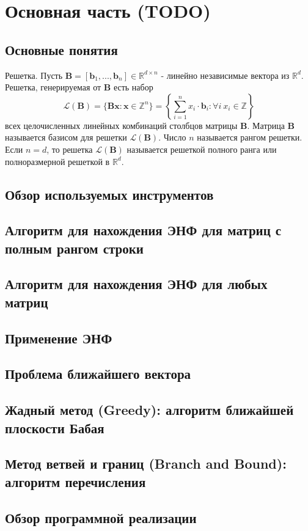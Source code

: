\newpage

\section{Основная часть (TODO)}

\subsection{Основные понятия}
Решетка. Пусть $ \mathbf{B} = [\mathbf{b}_1, ..., \mathbf{b}_n] \in \mathbb{R}^{d \times n} $ - линейно независимые вектора из $ \mathbb{R}^d $. Решетка, генерируемая от $\mathbf{B}$ есть набор $$ \mathcal{L}(\mathbf{B}) = \lbrace \mathbf{Bx}: \mathbf{x} \in \mathbb{Z}^n \rbrace = \left\{ \sum\limits_{i=1}^n x_i \cdot \mathbf{b}_i: \forall i \ x_i \in \mathbb{Z} \right\} $$
всех целочисленных линейных комбинаций столбцов матрицы $\mathbf{B}$. Матрица $\mathbf{B}$ называется базисом для решетки $\mathcal{L}(\mathbf{B})$. Число $n$ называется рангом решетки. Если $n = d$, то решетка $\mathcal{L}(\mathbf{B})$ называется решеткой полного ранга или полноразмерной решеткой в $\mathbb{R}^d$.

\subsection{Обзор используемых инструментов}

\subsection{Алгоритм для нахождения ЭНФ для матриц с полным рангом строки}

\subsection{Алгоритм для нахождения ЭНФ для любых матриц}

\subsection{Применение ЭНФ}

\subsection{Проблема ближайшего вектора}

\subsection{Жадный метод (Greedy): алгоритм ближайшей плоскости Бабая}

\subsection{Метод ветвей и границ (Branch and Bound): алгоритм перечисления}

\subsection{Обзор программной реализации}

\clearpage